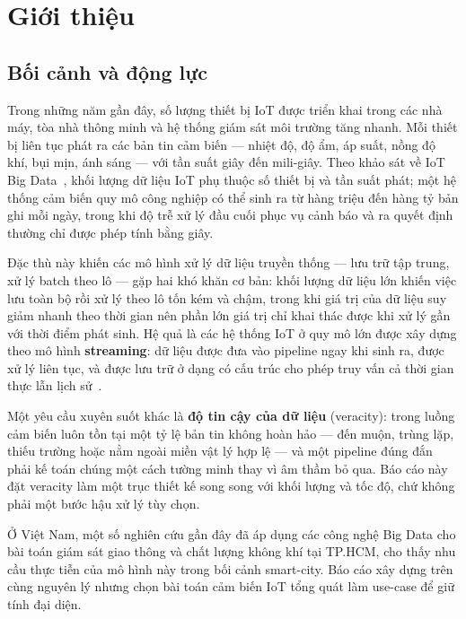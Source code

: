 \chapter{Giới thiệu}
\label{chap:introduction}

\section{Bối cảnh và động lực}

Trong những năm gần đây, số lượng thiết bị IoT được triển khai trong các
nhà máy, tòa nhà thông minh và hệ thống giám sát môi trường tăng nhanh.
Mỗi thiết bị liên tục phát ra các bản tin cảm biến --- nhiệt độ, độ ẩm,
áp suất, nồng độ khí, bụi mịn, ánh sáng --- với tần suất giây đến
mili-giây. Theo khảo sát về IoT Big Data~\cite{iot_big_data_survey_2022}, khối lượng
dữ liệu IoT phụ thuộc số thiết bị và tần suất phát; một hệ thống cảm biến
quy mô công nghiệp có thể sinh
ra từ hàng triệu đến hàng tỷ bản ghi mỗi ngày, trong khi độ trễ xử lý đầu
cuối phục vụ cảnh báo và ra quyết định thường chỉ được phép tính bằng giây.

Đặc thù này khiến các mô hình xử lý dữ liệu truyền thống --- lưu trữ
tập trung, xử lý batch theo lô --- gặp hai khó khăn cơ bản: khối lượng dữ
liệu lớn khiến việc lưu toàn bộ rồi xử lý theo lô tốn kém và chậm, trong
khi giá trị của dữ liệu suy giảm nhanh theo thời gian nên phần lớn giá trị
chỉ khai thác được khi xử lý gần với thời điểm phát sinh. Hệ quả là các hệ
thống IoT ở quy mô lớn được xây dựng theo mô hình \textbf{streaming}: dữ
liệu được đưa vào pipeline ngay khi sinh ra, được xử lý liên tục, và được
lưu trữ ở dạng có cấu trúc cho phép truy vấn cả thời gian thực lẫn lịch
sử~\cite{stream_processing_evolution_2024}.

Một yêu cầu xuyên suốt khác là \textbf{độ tin cậy của dữ liệu} (veracity):
trong luồng cảm biến luôn tồn tại một tỷ lệ bản tin không hoàn hảo --- đến
muộn, trùng lặp, thiếu trường hoặc nằm ngoài miền vật lý hợp lệ --- và một
pipeline đúng đắn phải kế toán chúng một cách tường minh thay vì âm thầm bỏ
qua. Báo cáo này đặt veracity làm một trục thiết kế song song với khối lượng
và tốc độ, chứ không phải một bước hậu xử lý tùy chọn.

Ở Việt Nam, một số nghiên cứu gần đây đã áp dụng các công nghệ Big Data cho
bài toán giám sát giao thông và chất lượng không khí tại TP.HCM, cho thấy
nhu cầu thực tiễn của mô hình này trong bối cảnh smart-city. Báo cáo xây
dựng trên cùng nguyên lý nhưng chọn bài toán cảm biến IoT tổng quát làm
use-case để giữ tính đại diện.

